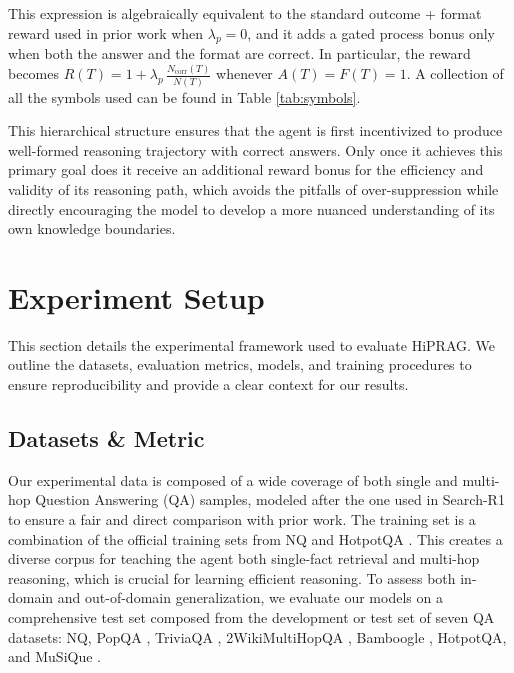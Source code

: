 \documentclass{article}
\begin{document}
This expression is algebraically equivalent to the standard outcome + format reward used in prior work
when $\lambda_p{=}0$, and it adds a gated process bonus only when both the answer and the format are
correct. In particular, the reward becomes
\(
R(T)=1+\lambda_p\,\frac{N_{\text{corr}}(T)}{N(T)}
\)
whenever $A(T){=}F(T){=}1$. A collection of all the symbols used can be found in Table \ref{tab:symbols}.

This hierarchical structure ensures that the agent is first incentivized to produce well-formed reasoning trajectory with correct answers. Only once it achieves this primary goal does it receive an additional reward bonus for the efficiency and validity of its reasoning path, which avoids the pitfalls of over-suppression while directly encouraging the model to develop a more nuanced understanding of its own knowledge boundaries.

\section{Experiment Setup}
\label{sec:experiment_setup}
This section details the experimental framework used to evaluate HiPRAG. We outline the datasets, evaluation metrics, models, and training procedures to ensure reproducibility and provide a clear context for our results.

\subsection{Datasets \& Metric}
\label{ssec:datasets_and_metrics}
Our experimental data is composed of a wide coverage of both single and multi-hop Question Answering (QA) samples, modeled after the one used in Search-R1 to ensure a fair and direct comparison with prior work. The training set is a combination of the official training sets from NQ and HotpotQA . This creates a diverse corpus for teaching the agent both single-fact retrieval and multi-hop reasoning, which is crucial for learning efficient reasoning. To assess both in-domain and out-of-domain generalization, we evaluate our models on a comprehensive test set composed from the development or test set of seven QA datasets: NQ, PopQA , TriviaQA , 2WikiMultiHopQA , Bamboogle , HotpotQA, and MuSiQue .
\end{document}
